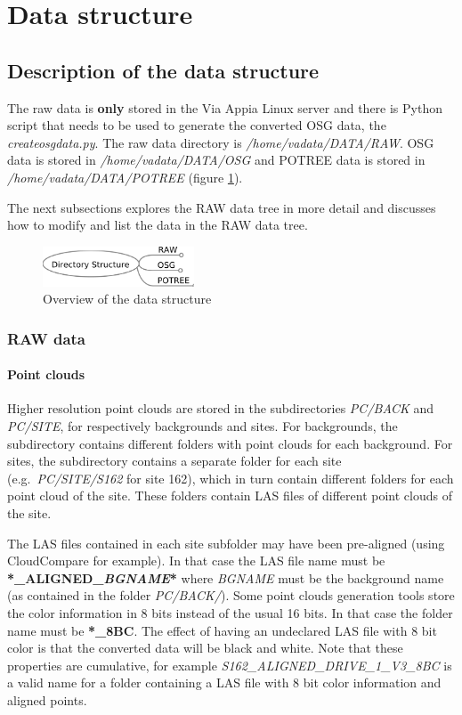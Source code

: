 \section{Data structure}
\label{sec:data_structure}

\subsection{Description of the data structure}
\label{sec:descriptiondata}
The raw data is \textbf{only} stored in the Via Appia Linux server and there is Python script that needs to be used to generate the converted OSG data, the \textit{createosgdata.py}. The raw data directory is \textit{/home/vadata/DATA/RAW}. OSG data is stored in \textit{/home/vadata/DATA/OSG} and POTREE data is stored in \textit{/home/vadata/DATA/POTREE} (figure \ref{fig:directory_structure_overview}). 

The next subsections explores the RAW data tree in more detail and discusses how to modify and list the data in the RAW data tree.

\begin{figure}[!ht]
 \centering
 \includegraphics[width=0.4\textwidth]{fig/directory_structure_overview}
 \caption{Overview of the data structure}
 \label{fig:directory_structure_overview}
\end{figure}

\subsubsection{RAW data}
\paragraph{Point clouds}
Higher resolution point clouds are stored in the subdirectories \textit{PC/BACK} and \textit{PC/SITE}, for respectively backgrounds and sites. For backgrounds, the subdirectory contains different folders with point clouds for each background. For sites, the subdirectory contains a separate folder for each site (e.g.\ \textit{PC/SITE/S162} for site 162), which in turn contain different folders for each point cloud of the site. These folders contain LAS files of different point clouds of the site. 

The LAS files contained in each site subfolder may have been pre-aligned (using CloudCompare for example). In that case the LAS file name must be \textbf{*\_ALIGNED\_\textit{BGNAME}*} where \textit{BGNAME} must be the background name (as contained in the folder \textit{PC/BACK/}).
Some point clouds generation tools store the color information in 8 bits instead of the usual 16 bits. In that case the folder name must be \textbf{*\_8BC}. The effect of having an undeclared LAS file with 8 bit color is that the converted data will be black and white. Note that these properties are cumulative, for example \textit{S162\_ALIGNED\_DRIVE\_1\_V3\_8BC} is a valid name for a folder containing a LAS file with 8 bit color information and aligned points.

